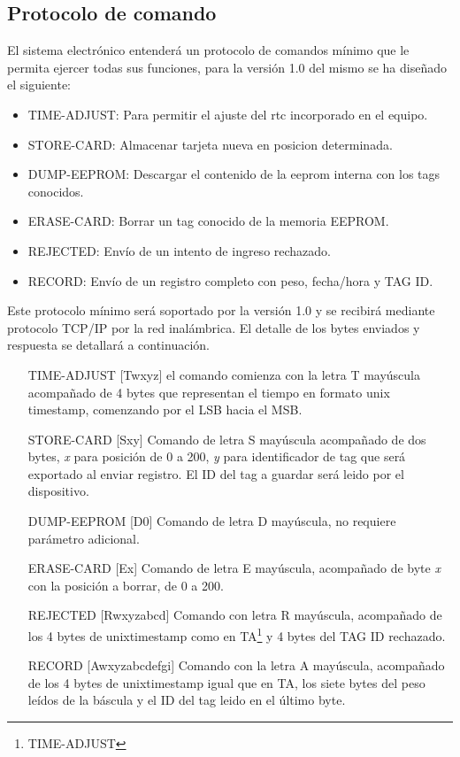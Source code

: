 \subsection{Protocolo de comando}
El sistema electrónico entenderá un protocolo de comandos mínimo que le permita ejercer todas sus funciones, para la versión 1.0 del mismo se ha diseñado el siguiente:
\begin{itemize}
	\item TIME-ADJUST: Para permitir el ajuste del rtc incorporado en el equipo.
	\item STORE-CARD: Almacenar tarjeta nueva en posicion determinada.
	\item DUMP-EEPROM: Descargar el contenido de la eeprom interna con los tags conocidos.
	\item ERASE-CARD: Borrar un tag conocido de la memoria EEPROM.
	\item REJECTED: Envío de un intento de ingreso rechazado.
	\item RECORD: Envío de un registro completo con peso, fecha/hora y TAG ID.
\end{itemize}
Este protocolo mínimo será soportado por la versión 1.0 y se recibirá mediante protocolo TCP/IP por la red inalámbrica. El detalle de los bytes enviados y respuesta se detallará a continuación.

\begin{itemize}
	\item[TIME-ADJUST] [Twxyz] el comando comienza con la letra T mayúscula acompañado de 4 bytes que representan el tiempo en formato unix timestamp, comenzando por el LSB hacia el MSB\label{itm:ta}.
	\item[STORE-CARD] [Sxy] Comando de letra S mayúscula acompañado de dos bytes, \emph{x} para posición de 0 a 200, \emph{y} para identificador de tag que será exportado al enviar registro. El ID del tag a guardar será leido por el dispositivo.\label{itm:sc}
	\item[DUMP-EEPROM] [D0] Comando de letra D mayúscula, no requiere parámetro adicional.
	\item[ERASE-CARD] [Ex] Comando de letra E mayúscula, acompañado de byte \emph{x} con la posición a borrar, de 0 a 200.
	\item[REJECTED] [Rwxyzabcd] Comando con letra R mayúscula, acompañado de los 4 bytes de unixtimestamp como en TA\footnote{TIME-ADJUST} y 4 bytes del TAG ID rechazado.
	\item[RECORD] [Awxyzabcdefgi] Comando con la letra A mayúscula, acompañado de los 4 bytes de unixtimestamp igual que en TA, los siete bytes del peso leídos de la báscula y el ID del tag leido en el último byte.
\end{itemize}

